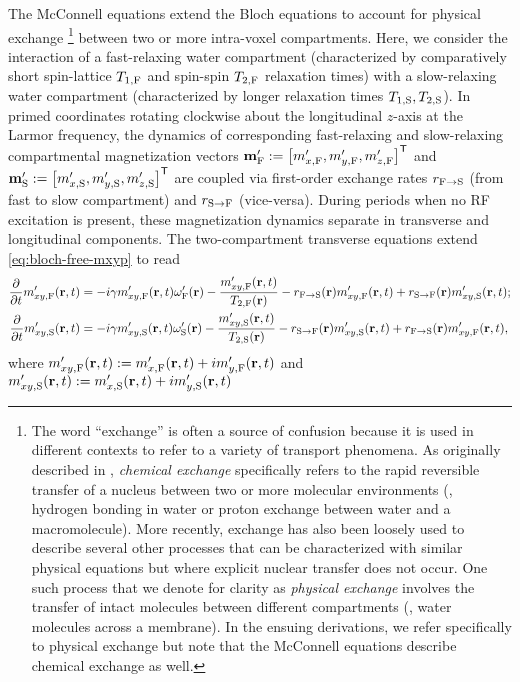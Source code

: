 The McConnell equations \cite{mcconnell:58:rrb}
extend the Bloch equations \cite{bloch:1946:ni-paper}
to account for physical exchange
\footnote{%
	The word ``exchange'' 
  is often a source of confusion 
  because it is used in different contexts
  to refer to a variety of transport phenomena.
  As originally described in \cite{mcconnell:58:rrb},
  \emph{chemical exchange} specifically refers 
  to the rapid reversible transfer
  of a nucleus 
  between two or more molecular environments
  (\eg, hydrogen bonding in water
  or proton exchange 
  between water and a macromolecule). 
  More recently,
  exchange has also been loosely used 
  to describe several other processes
  that can be characterized
  with similar physical equations
  but where explicit nuclear transfer does not occur.
  One such process
  that we denote for clarity
  as \emph{physical exchange}
  involves the transfer
  of intact molecules 
  between different compartments
  (\eg, water molecules across a membrane).
  In the ensuing derivations,
  we refer specifically
  to physical exchange
  but note that the McConnell equations
  describe chemical exchange as well.
}
between two or more intra-voxel compartments.
Here,
we consider the interaction
of a fast-relaxing water compartment
(characterized by comparatively short spin-lattice $T_{1,\mathrm{F}}$ 
and spin-spin $T_{2,\mathrm{F}}$ relaxation times) 
with a slow-relaxing water compartment
(characterized by longer relaxation times $T_{1,\mathrm{S}},T_{2,\mathrm{S}}$).
In primed coordinates rotating clockwise 
about the longitudinal $z$-axis
at the Larmor frequency,
the dynamics 
of corresponding fast-relaxing and slow-relaxing
compartmental magnetization vectors
$\bmmpf := \brac{\mxpf, \mypf, \mzpf}\tpose$
and
$\bmmps := \brac{\mxps, \myps, \mzps}\tpose$
are coupled via first-order exchange rates 
$r_{\mathrm{F}\to\mathrm{S}}$ (from fast to slow compartment) 
and $r_{\mathrm{S}\to\mathrm{F}}$ (vice-versa).
During periods when no RF excitation is present,
these magnetization dynamics
separate in transverse and longitudinal components.
The two-compartment transverse equations 
extend \eqref{eq:bloch-free-mxyp} to read
\begin{align}
	\dela{t} \mxypf\prt &= 
		-i\gam \mxypf\prt \ompf\pr - \frac{\mxypf\prt}{\tf{2}\pr} 
		- \rfs\pr \mxypf\prt + \rsf\pr \mxyps\prt;
		\label{eq:mwf,mxy-f} \\
	\dela{t} \mxyps\prt &= 
		-i\gam \mxyps\prt \omps\pr - \frac{\mxyps\prt}{\ts{2}\pr} 
		- \rsf\pr \mxyps\prt + \rfs\pr \mxypf\prt,
		\label{eq:mwf,mxy-s}
\end{align}
where 
$\mxypf\prt := \mxpf\prt + i\mypf\prt$ 
and $\mxyps\prt := \mxps\prt + i\myps\prt$
